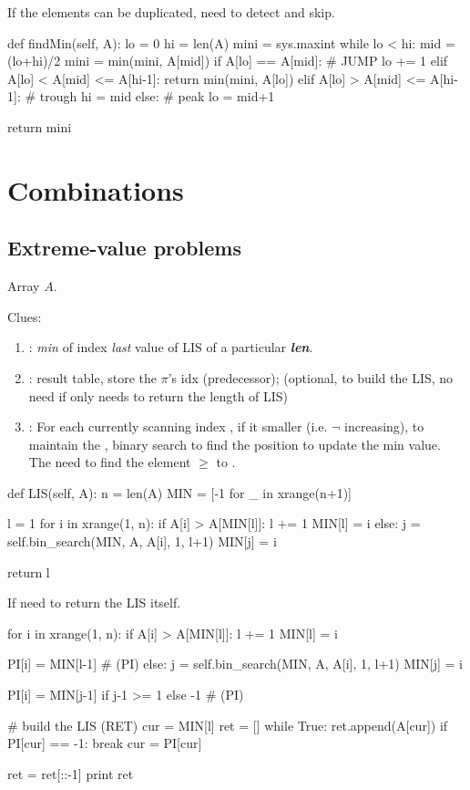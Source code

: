 If the elements can be duplicated, need to detect and skip. 
\begin{python}
def findMin(self, A):
    lo = 0
    hi = len(A)
    mini = sys.maxint
    while lo < hi:
        mid = (lo+hi)/2
        mini = min(mini, A[mid])
        if A[lo] == A[mid]:  # JUMP
            lo += 1
        elif A[lo] < A[mid] <= A[hi-1]:
            return min(mini, A[lo])
        elif A[lo] > A[mid] <= A[hi-1]:  # trough
            hi = mid
        else:  # peak
            lo = mid+1

    return mini
\end{python}
\section{Combinations}
\subsection{Extreme-value problems}\label{extremeValueProblem}
 Array $A$.

Clues:
\begin{enumerate}
\item {}: \textit{min} of index \textit{last} value of LIS of a particular \textit{\textbf{len}}.
\item {}: result table, store the $\pi$'s idx (predecessor); (optional, to build the LIS, no need if only needs to return the length of LIS)
\item {}: For each currently scanning index , if it smaller (i.e. $\neg$ increasing), to maintain the , binary search to find the position to update the min value. The  need to find the element $\geq$ to .
\end{enumerate}
\newpage
\begin{python}
def LIS(self, A):
    n = len(A)
    MIN = [-1 for _ in xrange(n+1)]
    
    l = 1
    for i in xrange(1, n):
        if A[i] > A[MIN[l]]:
            l += 1
            MIN[l] = i
        else:
            j = self.bin_search(MIN, A, A[i], 1, l+1)
            MIN[j] = i

    return l
\end{python}
If need to return the LIS itself. 
\begin{python}
    for i in xrange(1, n):
        if A[i] > A[MIN[l]]:
            l += 1
            MIN[l] = i

            PI[i] = MIN[l-1]  # (PI)
        else:
            j = self.bin_search(MIN, A, A[i], 1, l+1)
            MIN[j] = i

            PI[i] = MIN[j-1] if j-1 >= 1 else -1  # (PI)

    # build the LIS (RET)
    cur = MIN[l]
    ret = []
    while True:
        ret.append(A[cur])
        if PI[cur] == -1: break
        cur = PI[cur]

    ret = ret[::-1]
    print ret
\end{python}

